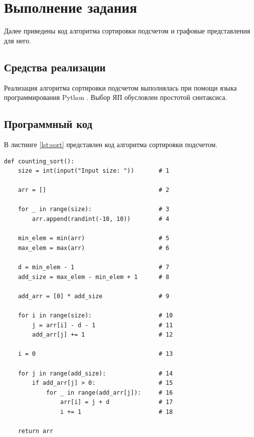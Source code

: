 \chapter{Выполнение задания}

Далее приведены код алгоритма сортировки подсчетом \cite{sort} и графовые представления для него.

\section{Средства реализации}

Реализация алгоритма сортировки подсчетом выполнялась при помощи языка программирования Python \cite{python}. Выбор ЯП обусловлен простотой синтаксиса.

\section{Программный код}

В листинге \ref{lst:sort} представлен код алгоритма сортировки подсчетом.
\clearpage
\begin{center}
\captionsetup{justification=raggedright,singlelinecheck=off}
\begin{lstlisting}[label=lst:sort,caption=Сортировка подсчетом]
def counting_sort():
    size = int(input("Input size: "))       # 1

    arr = []                                # 2

    for _ in range(size):                   # 3
        arr.append(randint(-10, 10))        # 4

    min_elem = min(arr)                     # 5
    max_elem = max(arr)                     # 6
    
    d = min_elem - 1                        # 7
    add_size = max_elem - min_elem + 1      # 8

    add_arr = [0] * add_size                # 9

    for i in range(size):                   # 10
        j = arr[i] - d - 1                  # 11
        add_arr[j] += 1                     # 12
    
    i = 0                                   # 13

    for j in range(add_size):               # 14
        if add_arr[j] > 0:                  # 15
            for _ in range(add_arr[j]):     # 16
                arr[i] = j + d              # 17
                i += 1                      # 18

    return arr
\end{lstlisting} 
\end{center}

